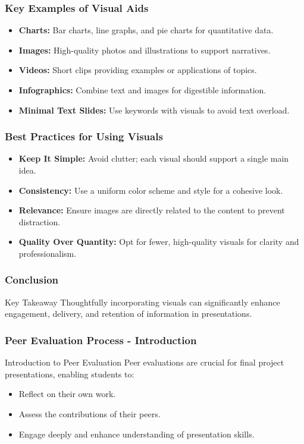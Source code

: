 \documentclass[aspectratio=169]{beamer}
\begin{document}
\begin{frame}[fragile]
    \frametitle{Key Examples of Visual Aids}
    \begin{itemize}
        \item \textbf{Charts:} Bar charts, line graphs, and pie charts for quantitative data.
        \item \textbf{Images:} High-quality photos and illustrations to support narratives.
        \item \textbf{Videos:} Short clips providing examples or applications of topics.
        \item \textbf{Infographics:} Combine text and images for digestible information.
        \item \textbf{Minimal Text Slides:} Use keywords with visuals to avoid text overload.
    \end{itemize}
\end{frame}

\begin{frame}[fragile]
    \frametitle{Best Practices for Using Visuals}
    \begin{itemize}
        \item \textbf{Keep It Simple:} Avoid clutter; each visual should support a single main idea.
        \item \textbf{Consistency:} Use a uniform color scheme and style for a cohesive look.
        \item \textbf{Relevance:} Ensure images are directly related to the content to prevent distraction.
        \item \textbf{Quality Over Quantity:} Opt for fewer, high-quality visuals for clarity and professionalism.
    \end{itemize}
\end{frame}

\begin{frame}[fragile]
    \frametitle{Conclusion}
    \begin{block}{Key Takeaway}
        Thoughtfully incorporating visuals can significantly enhance engagement, delivery, and retention of information in presentations.
    \end{block}
\end{frame}

\begin{frame}[fragile]
  \frametitle{Peer Evaluation Process - Introduction}
  \begin{block}{Introduction to Peer Evaluation}
    Peer evaluations are crucial for final project presentations, enabling students to:
    \begin{itemize}
      \item Reflect on their own work.
      \item Assess the contributions of their peers.
      \item Engage deeply and enhance understanding of presentation skills.
    \end{itemize}
  \end{block}
\end{frame}
\end{document}
